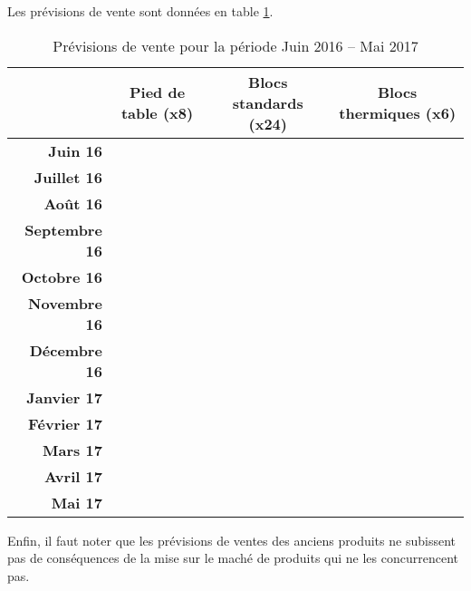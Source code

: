 Les prévisions de vente sont données en table \ref{prevVente}.
\begin{table}[!ht]
	\centering
	\begin{tabular}{>{\bfseries}rccc}
		\toprule
		& \textbf{Pied de table (x8)} & \textbf{Blocs standards (x24)} &
		\textbf{Blocs
		thermiques (x6)} \\
		\midrule
		Juin 16 & \\
		Juillet 16 & \\
		Août 16 & \\
		Septembre 16 & \\
		Octobre 16 &\\
		Novembre 16 & \\
		Décembre 16 & \\
		Janvier 17 & \\
		Février 17 & \\
		Mars 17 & \\
		Avril 17 & \\
		Mai 17 &\\
		\bottomrule
	\end{tabular}
	\caption{Prévisions de vente pour la période Juin 2016 -- Mai
	2017\label{prevVente}}
\end{table}

Enfin, il faut noter que les prévisions de ventes des anciens produits
ne subissent pas de conséquences de la mise sur le maché de produits qui
ne les concurrencent pas.
